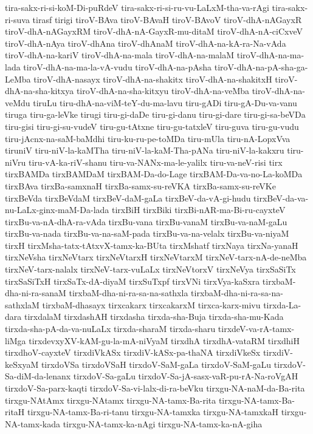 {tira-sakx-ri-si-koM-Di-puRdeV
tira-sakx-ri-si-ru-vu-LaLxM-tha-va-rAgi
tira-sakx-ri-suva
tirasf
tirigi
tiroV-BAva
tiroV-BAvaH
tiroV-BAvoV
tiroV-dhA-nAGayxR
tiroV-dhA-nAGayxRM
tiroV-dhA-nA-GayxR-mu-ditaM
tiroV-dhA-nA-ciCxveV
tiroV-dhA-nAya
tiroV-dhAna
tiroV-dhAnaM
tiroV-dhA-na-kA-ra-Na-vAda
tiroV-dhA-na-kariV
tiroV-dhA-na-mala
tiroV-dhA-na-malaM
tiroV-dhA-na-ma-lada
tiroV-dhA-na-ma-la-vA-vudu
tiroV-dhA-na-pAsha
tiroV-dhA-na-pA-sha-ga-LeMba
tiroV-dhA-nasayx
tiroV-dhA-na-shakitx
tiroV-dhA-na-shakitxH
tiroV-dhA-na-sha-kitxya
tiroV-dhA-na-sha-kitxyu
tiroV-dhA-na-veMba
tiroV-dhA-na-veMdu
tiruLu
tiru-dhA-na-viM-teY-du-ma-lavu
tiru-gADi
tiru-gA-Du-va-vanu
tiruga
tiru-ga-leVke
tirugi
tiru-gi-daDe
tiru-gi-danu
tiru-gi-dare
tiru-gi-sa-beVDa
tiru-gisi
tiru-gi-su-vudeV
tiru-gu-tAtxne
tiru-gu-tatxleV
tiru-guva
tiru-gu-vudu
tiru-jAcnx-na-saM-baMdhi
tiru-ku-ru-pe-toMDa
tiru-mUla
tiru-nA-LopxVva
tiruniV
tiru-niV-la-kaMTha
tiru-niV-la-kaM-Tha-pANa
tiru-niV-la-kakxru
tiru-niVru
tiru-vA-ka-riV-shanu
tiru-va-NANx-ma-le-yalilx
tiru-va-neV-risi
tirx
tirxBAMDa
tirxBAMDaM
tirxBAM-Da-do-Lage
tirxBAM-Da-va-no-La-koMDa
tirxBAva
tirxBa-samxnaH
tirxBa-samx-su-reVKA
tirxBa-samx-su-reVKe
tirxBeVda
tirxBeVdaM
tirxBeV-daM-gaLa
tirxBeV-da-vA-gi-hudu
tirxBeV-da-va-nu-LaLx-ginx-maM-Da-lada
tirxBiH
tirxBiki
tirxBi-nAR-ma-Bi-ru-cayxteV
tirxBu-va-nA-dhA-ra-vAda
tirxBu-vana
tirxBu-vanaM
tirxBu-va-naM-gaLu
tirxBu-va-nada
tirxBu-va-na-saM-pada
tirxBu-va-na-velalx
tirxBu-va-niyaM
tirxH
tirxMsha-tatx-tAtxvX-tamx-ka-BUta
tirxMshatf
tirxNaya
tirxNa-yanaH
tirxNeVsha
tirxNeVtarx
tirxNeVtarxH
tirxNeVtarxM
tirxNeV-tarx-nA-de-neMba
tirxNeV-tarx-nalalx
tirxNeV-tarx-vuLaLx
tirxNeVtorxV
tirxNeVya
tirxSaSiTx
tirxSaSiTxH
tirxSaTx-dA-diyaM
tirxSuTxpf
tirxVNi
tirxVya-kaSxra
tirxbaM-dha-ni-ra-sanaM
tirxbaM-dha-ni-ra-sa-na-sathxla
tirxbaM-dha-ni-ra-sa-na-sathxlaM
tirxbaM-dhasayx
tirxcakarx
tirxcakarxM
tirxca-karx-mivu
tirxda-La-dara
tirxdalaM
tirxdashAH
tirxdasha
tirxda-sha-Buja
tirxda-sha-mu-Kada
tirxda-sha-pA-da-va-nuLaLx
tirxda-sharaM
tirxda-sharu
tirxdeV-va-rA-tamx-liMga
tirxdevxyXV-kAM-gu-la-mA-niVyaM
tirxdhA
tirxdhA-vataRM
tirxdhiH
tirxdhoV-cayxteV
tirxdiVkASx
tirxdiV-kASx-pa-thaNA
tirxdiVkeSx
tirxdiV-keSxyaM
tirxdoVSa
tirxdoVSaH
tirxdoV-SaM-gaLa
tirxdoV-SaM-gaLu
tirxdoV-Sa-diM-da-lenanx
tirxdoV-Sa-gaLu
tirxdoV-Sa-jA-sasx-vaR-pu-rA-Na-roVgAH
tirxdoV-Sa-parx-kaqti
tirxdoV-Sa-vi-lalx-di-ra-beVku
tirxgu-NA-naM-da-Ba-rita
tirxgu-NAtAmx
tirxgu-NAtamx
tirxgu-NA-tamx-Ba-rita
tirxgu-NA-tamx-Ba-ritaH
tirxgu-NA-tamx-Ba-ri-tanu
tirxgu-NA-tamxka
tirxgu-NA-tamxkaH
tirxgu-NA-tamx-kada
tirxgu-NA-tamx-ka-nAgi
tirxgu-NA-tamx-ka-nA-giha
}
